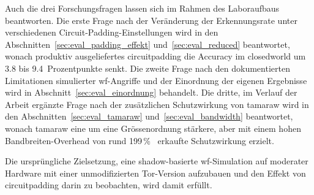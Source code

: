 Auch die drei Forschungsfragen lassen sich im Rahmen des Laboraufbaus beantworten.
Die erste Frage nach der Veränderung der Erkennungsrate unter verschiedenen Circuit-Padding-Einstellungen wird in den Abschnitten~\ref{sec:eval_padding_effekt} und~\ref{sec:eval_reduced} beantwortet, wonach produktiv ausgeliefertes \gls{circuitpadding} die Accuracy im \gls{closedworld} um 3.8 bis 9.4~Prozentpunkte senkt.
Die zweite Frage nach den dokumentierten Limitationen simulierter \gls{wf}-Angriffe und der Einordnung der eigenen Ergebnisse wird in Abschnitt~\ref{sec:eval_einordnung} behandelt.
Die dritte, im Verlauf der Arbeit ergänzte Frage nach der zusätzlichen Schutzwirkung von \gls{tamaraw} wird in den Abschnitten~\ref{sec:eval_tamaraw} und~\ref{sec:eval_bandwidth} beantwortet, wonach \gls{tamaraw} eine um eine Grössenordnung stärkere, aber mit einem hohen Bandbreiten-Overhead von rund 199\,\%~\cite{cai2014systematic} erkaufte Schutzwirkung erzielt.

Die ursprüngliche Zielsetzung, eine \gls{shadow}-basierte \gls{wf}-Simulation auf moderater Hardware mit einer unmodifizierten Tor-Version aufzubauen und den Effekt von \gls{circuitpadding} darin zu beobachten, wird damit erfüllt.
